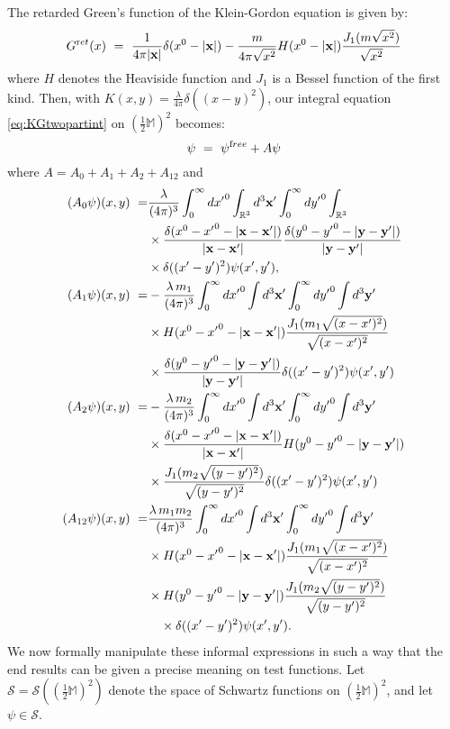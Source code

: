\documentclass[b5paper,draft,openbib,12pt]{memoir}
\newcommand{\M}{\mathbb{M}}
\newcommand{\vx}{\mathbf{x}}
\newcommand{\vy}{\mathbf{y}}
\newcommand{\ret}{{\textup ret}}
\newcommand{\free}{{\textup free}}
\begin{document}
The retarded Green's function of the Klein-Gordon equation is given 
by:
\begin{equation}
	G^\ret(x) ~=~ \frac{1}{4\pi|\vx|}\delta(x^0-|\vx|) - \frac{m}{4\pi \sqrt{x^2}} H(x^0-|\vx|) \frac{J_1(m\sqrt{x^2})}{\sqrt{x^2}} 
	\label{eq:gretkg}
\end{equation}
where $H$ denotes the Heaviside function and $J_1$ is a
Bessel function of the first kind.
Then, with $K(x,y) = \frac{\lambda}{4\pi} \delta((x-y)^2)$, our 
integral equation \eqref{eq:KGtwopartint} on $(\tfrac{1}{2}\M)^2$ becomes:
\begin{equation}
	\psi ~=~ \psi^\free + A \psi
\label{eq:abstractinteq}
\end{equation}
where $A = A_0 + A_1 + A_2 + A_{12}$ and
\begin{align}
(A_0 \psi)(x,y) ~=& \frac{\lambda}{(4\pi)^3} \int_0^\infty d {x'}^0 \int_{\mathbb{R}^3} d^3 \vx' \int_0^\infty d{y'}^0 \int_{\mathbb{R}^3} \nonumber\\ 
  &\times \frac{\delta(x^0-{x'}^0-|\vx-\vx'|)}{|\vx-\vx'|}\frac{\delta(y^0-{y'}^0-|\vy-\vy'|)}{|\vy-\vy'|}\notag\\
  &\times\delta((x'-y')^2) \psi(x',y'),\label{eq:a0informal}\\
(A_1 \psi)(x,y) ~=&  -\frac{\lambda \, m_1}{(4 \pi)^3} \int_0^\infty d{x'}^0 \int d^3 \vx' \int_0^\infty d{y'}^0 \int d^3 \vy'  \nonumber\\
  &\times H(x^0-{x'}^0-|\vx-\vx'|)\frac{J_1(m_1\sqrt{(x-x')^2})}{\sqrt{(x-x')^2}} \notag \\
  &\times  \frac{\delta(y^0-{y'}^0-|\vy-\vy'|)}{|\vy-\vy'|}\delta((x'-y')^2) \psi(x',y')\label{eq:a1informal}\\
(A_2 \psi)(x,y) ~=& -\frac{\lambda \, m_2}{(4 \pi)^3} \int_0^\infty d{x'}^0 \int d^3 \vx' \int_0^\infty d{y'}^0 \int d^3 \vy' \nonumber\\
& \times \frac{\delta(x^0-{x'}^0-|\vx-\vx'|)}{|\vx-\vx'|}H(y^0-{y'}^0-|\vy-\vy'|) \notag\\
& \times \frac{J_1(m_2\sqrt{(y-y')^2})}{\sqrt{(y-y')^2}} \delta((x'-y')^2) \psi(x',y') \label{eq:a2informal}\\
(A_{12} \psi)(x,y) ~=& \frac{\lambda \, m_1 m_2}{(4\pi)^3}  \int_0^\infty d{x'}^0 \int d^3 \vx' \int_0^\infty d{y'}^0 \int d^3 \vy'  \nonumber\\
&\times H(x^0-{x'}^0-|\vx-\vx'|) \frac{J_1(m_1\sqrt{(x-x')^2})}{\sqrt{(x-x')^2}}  \nonumber\\
&\times H(y^0-{y'}^0-|\vy-\vy'|) \frac{J_1(m_2\sqrt{(y-y')^2})}{\sqrt{(y-y')^2}}\notag\\
&\quad \times\delta((x'-y')^2) \psi(x',y')\label{eq:a12informal}.
\end{align}
We now formally manipulate these informal expressions in such a way 
that the end results can be given a precise meaning on test 
functions. Let $\mathcal{S} = \mathcal{S}((\tfrac{1}{2}\M)^2)$ 
denote the space of Schwartz functions on $(\tfrac{1}{2}\M)^2$, 
and let $\psi \in \mathcal{S}$. 
\end{document}
